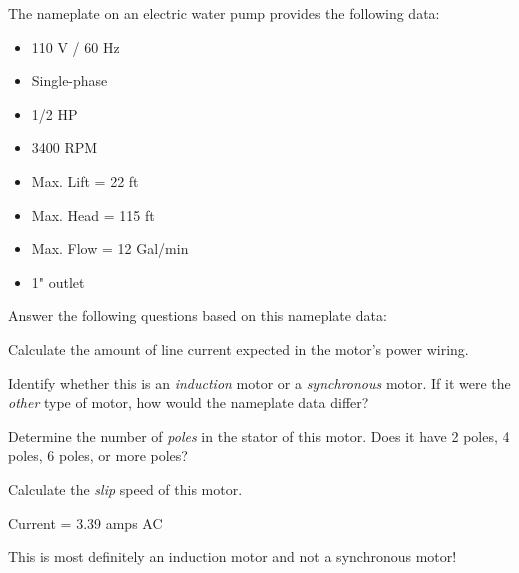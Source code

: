 

The nameplate on an electric water pump provides the following data:

\begin{itemize}
\item{} 110 V / 60 Hz
\item{} Single-phase
\item{} 1/2 HP
\item{} 3400 RPM
\item{} Max. Lift = 22 ft
\item{} Max. Head = 115 ft
\item{} Max. Flow = 12 Gal/min
\item{} 1" outlet
\end{itemize}

\vskip 10pt

\noindent
Answer the following questions based on this nameplate data:

\vskip 10pt

Calculate the amount of line current expected in the motor's power wiring.

\vskip 10pt

Identify whether this is an {\it induction} motor or a {\it synchronous} motor.  If it were the {\it other} type of motor, how would the nameplate data differ?

\vskip 10pt

Determine the number of {\it poles} in the stator of this motor.  Does it have 2 poles, 4 poles, 6 poles, or more poles?

\vskip 10pt

Calculate the {\it slip} speed of this motor.

\vskip 10pt







Current = 3.39 amps AC

\vskip 10pt

This is most definitely an induction motor and not a synchronous motor!
 





